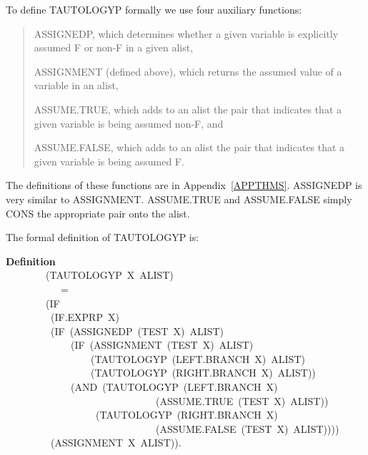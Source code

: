 \documentclass[10pt]{book}
\newenvironment{pubasis}{\begin{flushleft}}{\end{flushleft}}
\newenvironment{pubcrown}{\begin{quote}}{\end{quote}}
\newcommand{\axiomordefinition}[1]{\vspace{6pt}\Large\textsf{\textbf{#1}}\normalsize}
\begin{document}
To  define TAUTOLOGYP formally we use four auxiliary functions:
\begin{pubcrown}
ASSIGNEDP, which  determines whether a given variable is explicitly
assumed F or non-F in a given alist,

ASSIGNMENT (defined above), which returns  the assumed value
of a variable in an alist,

ASSUME.TRUE, which adds to an alist the pair that indicates that
a given variable is being assumed non-F, and

ASSUME.FALSE, which adds to an alist  the pair that indicates that
a given variable is being assumed F.
\end{pubcrown}

The definitions of these functions are in Appendix~\ref{APPTHMS}.  ASSIGNEDP is
very similar to ASSIGNMENT.  ASSUME.TRUE and ASSUME.FALSE simply
CONS the appropriate pair onto the alist.

The formal definition of TAUTOLOGYP is:
\begin{pubasis}
\axiomordefinition{Definition}\\
~~~~~~~~(TAUTOLOGYP~X~ALIST)\\
~~~~~~~~~~~=\\
~~~~~~~~(IF\\
~~~~~~~~~(IF.EXPRP~X)\\
~~~~~~~~~(IF~(ASSIGNEDP~(TEST~X)~ALIST)\\
~~~~~~~~~~~~~(IF~(ASSIGNMENT~(TEST~X)~ALIST)\\
~~~~~~~~~~~~~~~~~(TAUTOLOGYP~(LEFT.BRANCH~X)~ALIST)\\
~~~~~~~~~~~~~~~~~(TAUTOLOGYP~(RIGHT.BRANCH~X)~ALIST))\\
~~~~~~~~~~~~~(AND~(TAUTOLOGYP~(LEFT.BRANCH~X)\\
~~~~~~~~~~~~~~~~~~~~~~~~~~~~~~(ASSUME.TRUE~(TEST~X)~ALIST))\\
~~~~~~~~~~~~~~~~~~(TAUTOLOGYP~(RIGHT.BRANCH~X)\\
~~~~~~~~~~~~~~~~~~~~~~~~~~~~~~(ASSUME.FALSE~(TEST~X)~ALIST))))\\
~~~~~~~~~(ASSIGNMENT~X~ALIST)).\\
\end{pubasis}
\end{document}
